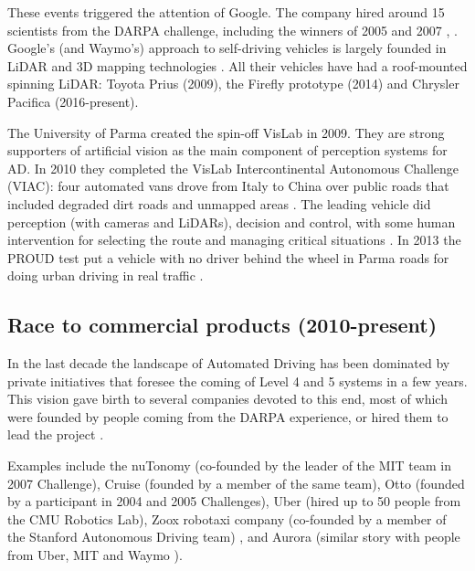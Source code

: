 \documentclass[journal]{IEEEtran}
\begin{document}
These events triggered the attention of Google. 
The company hired around 15 scientists from the DARPA challenge, 
including the winners of 2005 and 2007 \cite{Montemerlo2008}, 
\cite{Levinson2011}. Google's (and Waymo's) approach to self-driving vehicles
is largely founded in LiDAR and 3D mapping technologies \cite{Chapell2016}. 
All their vehicles have had a roof-mounted spinning LiDAR: Toyota Prius (2009),
the Firefly prototype (2014) and Chrysler Pacifica (2016-present).

The University of Parma created the spin-off VisLab in 2009. 
They are strong supporters of artificial vision as the main component of 
perception systems for AD. 
In 2010 they completed the VisLab Intercontinental Autonomous 
Challenge (VIAC): four automated vans drove from Italy to China over public 
roads that included degraded dirt roads and unmapped areas \cite{Bertozzi2011}.
The leading vehicle did perception (with cameras and LiDARs), decision and 
control, with some human intervention for selecting the route and managing 
critical situations \cite{Broggi2012}. 
In 2013 the PROUD test put a vehicle with no driver behind the wheel in Parma 
roads for doing urban driving in real traffic \cite{Broggi2013}. 

\subsection{Race to commercial products (2010-present)}

In the last decade the landscape of Automated Driving has been dominated by 
private initiatives that foresee the coming of Level 4 and 5 systems in a few 
years. This vision gave birth to several companies devoted to this end, most of 
which were founded by people coming from the DARPA experience, or hired them to
lead the project \cite{Chapell2016}. 

Examples include the nuTonomy (co-founded
by the leader of the MIT team in 2007 Challenge), Cruise (founded by a 
member of the same team), Otto (founded by a participant in 2004 and 2005 
Challenges), Uber (hired up to 50 people from the CMU Robotics Lab),  
Zoox robotaxi company (co-founded by a member of the Stanford 
Autonomous Driving team) %
\cite{Levinson2011a}, and Aurora (similar story with people from 
Uber, MIT and Waymo \cite{Anderson2013}).
\end{document}
